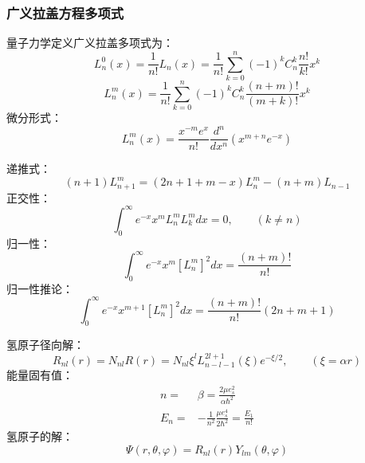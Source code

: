 \begin{frame}
	\frametitle{广义拉盖方程多项式}
	量子力学定义广义拉盖多项式为：
	\begin{equation*}
		L^0 _n (x)= \frac{1} {n!} L_n (x) = \frac{1} {n!} \sum_{k=0}^{n} (-1)^k C^k _n \frac{n!}{k!}x^k
	\end{equation*}	
	\begin{equation*}
		L^m _n (x)= \frac{1} {n!}  \sum_{k=0}^{n} (-1)^k C^k _n \frac{(n+m)!}{(m+k)!}x^k
	\end{equation*}	
	微分形式： 
	\begin{equation*}
		L^m _n(x) =\frac{x^{-m}e^x  }{n!} \frac{d ^n}{d x^n} (x^{m+n} e^{-x})
	\end{equation*}	
\end{frame}		

\begin{frame}
	递推式：
	\begin{equation*}
		(n+1)	L^m _{n+1} = (2n+1+m -x) L^m _n  - (n+m)  L_{n-1}  
	\end{equation*}	
	正交性：
	\begin{equation*}
		\int_{0}^{\infty}  e^{-x} x^m  L^m _n L^ m _k dx =0, \qquad  (k\ne n)
	\end{equation*}	
	归一性：
	\begin{equation*}
		\int_{0}^{\infty}  e^{-x} x^m  [L^m _{n}]^2  dx = \frac{(n+m)!}{n!} 
	\end{equation*}			
	归一性推论：
	\begin{equation*}
		\int_{0}^{\infty}  e^{-x} x^{m+1}  [L^m _{n}]^2  dx = \frac{(n+m)!}{n!}  (2n+m+1)
	\end{equation*}			
\end{frame}		

\begin{frame}
	氢原子径向解：
	\begin{equation*}
		R_{nl} (r) =N_{nl}R(r)=N_{nl} \xi  ^l  L_{n-l-1} ^{2l+1} (\xi) e^{-\xi/2} , \qquad (\xi =\alpha r)
	\end{equation*}			
	能量固有值：
	\begin{equation*}
		\begin{split}
			n =&\beta = \frac{2\mu e^2 _s}{\alpha \hbar ^2} \\
			E_n =& - \frac{1}{n^2} \frac{\mu e^4 _s }{2 \hbar ^2} =\frac{E_1}{n!}
		\end{split}		
	\end{equation*}	
	氢原子的解：
	\begin{equation*}
		\Psi(r,\theta,\varphi) =  R_{nl} (r) Y_{lm} (\theta,\varphi)
	\end{equation*}
\end{frame}		

